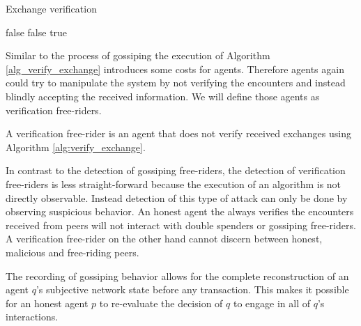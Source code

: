 \begin{algorithm}
\caption{Exchange verification}\label{alg:verify_exchange}
\begin{algorithmic}[1]
 \Return false
\EndIf
\EndFor
{}
 \Return false
\EndIf
\EndFor
\Return true
\EndProcedure
\end{algorithmic}
\end{algorithm}

Similar to the process of gossiping the execution of Algorithm \ref{alg_verify_exchange} introduces
some costs for agents. Therefore agents again could try to manipulate the system by not verifying 
the encounters and instead blindly accepting the received information. We will define those agents
as verification free-riders.

\begin{defn}
    A verification free-rider is an agent that does not verify received exchanges using Algorithm 
    \ref{alg:verify_exchange}.
\end{defn}

In contrast to the detection of gossiping free-riders, the detection of verification free-riders is
less straight-forward because the execution of an algorithm is not directly observable. Instead 
detection of this type of attack can only be done by observing suspicious behavior. An honest agent
the always verifies the encounters received from peers will not interact with double spenders or 
gossiping free-riders. A verification free-rider on the other hand cannot discern between honest,
malicious and free-riding peers. 

The recording of gossiping behavior allows for the complete reconstruction of an agent $q$'s subjective
network state before any transaction. This makes it possible for an honest agent $p$ to re-evaluate the 
decision of $q$ to engage in all of $q$'s interactions.

